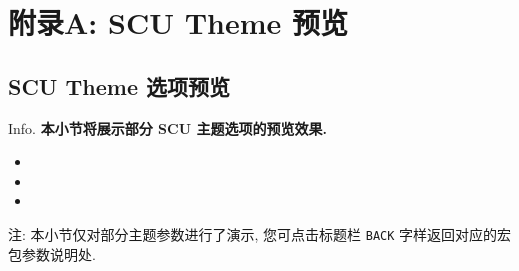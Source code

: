 \section{附录A: SCU Theme 预览}
\subsection{SCU Theme 选项预览}
\begin{frame}{Info.}
	\textbf{本小节将展示部分 SCU 主题选项的预览效果.}
	\begin{multicols}{2}
		\begin{itemize}
			\item {}
			\item {}
			\item {}
		\end{itemize}
	\end{multicols}
	注: 本小节仅对部分主题参数进行了演示, 您可点击标题栏 \texttt{BACK} 字样返回对应的宏包参数说明处.\par
	\mycopyright
\end{frame}

